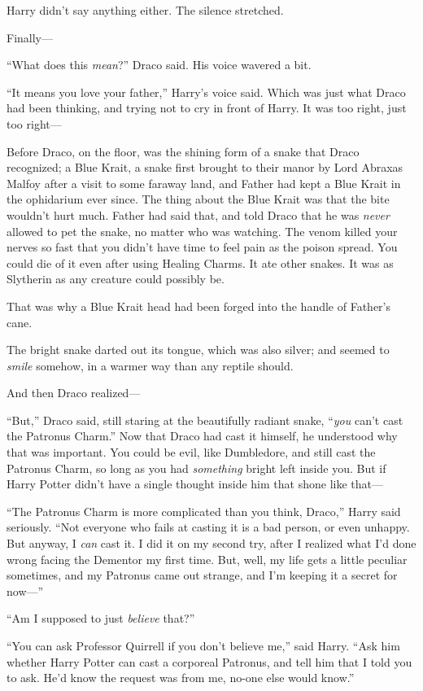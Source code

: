 Harry didn’t say anything either. The silence stretched.

Finally—

“What does this \emph{mean}?” Draco said. His voice wavered a bit.

“It means you love your father,” Harry’s voice said. Which was just what Draco had been thinking, and trying not to cry in front of Harry. It was too right, just too right—

Before Draco, on the floor, was the shining form of a snake that Draco recognized; a Blue Krait, a snake first brought to their manor by Lord Abraxas Malfoy after a visit to some faraway land, and Father had kept a Blue Krait in the ophidarium ever since. The thing about the Blue Krait was that the bite wouldn’t hurt much. Father had said that, and told Draco that he was \emph{never} allowed to pet the snake, no matter who was watching. The venom killed your nerves so fast that you didn’t have time to feel pain as the poison spread. You could die of it even after using Healing Charms. It ate other snakes. It was as Slytherin as any creature could possibly be.

That was why a Blue Krait head had been forged into the handle of Father’s cane.

The bright snake darted out its tongue, which was also silver; and seemed to \emph{smile} somehow, in a warmer way than any reptile should.

And then Draco realized—

“But,” Draco said, still staring at the beautifully radiant snake, “\emph{you} can’t cast the Patronus Charm.” Now that Draco had cast it himself, he understood why that was important. You could be evil, like Dumbledore, and still cast the Patronus Charm, so long as you had \emph{something} bright left inside you. But if Harry Potter didn’t have a single thought inside him that shone like that—

“The Patronus Charm is more complicated than you think, Draco,” Harry said seriously. “Not everyone who fails at casting it is a bad person, or even unhappy. But anyway, I \emph{can} cast it. I did it on my second try, after I realized what I’d done wrong facing the Dementor my first time. But, well, my life gets a little peculiar sometimes, and my Patronus came out strange, and I’m keeping it a secret for now—”

“Am I supposed to just \emph{believe} that?”

“You can ask Professor Quirrell if you don’t believe me,” said Harry. “Ask him whether Harry Potter can cast a corporeal Patronus, and tell him that I told you to ask. He’d know the request was from me, no-one else would know.”

